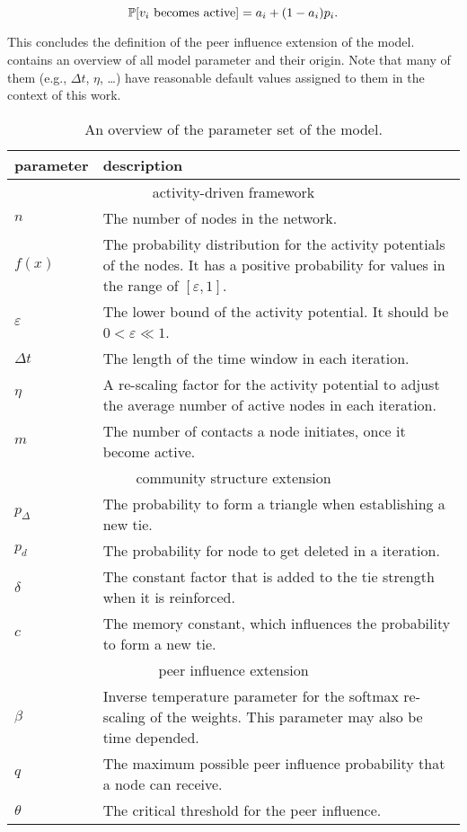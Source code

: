 \begin{equation}
    \mathbb{P}[{v_i \text{ becomes active}}] = a_{i} + (1 - a_{i}) p_{i}.
\end{equation}

This concludes the definition of the peer influence extension of the model.
 contains an overview of all model parameter and their origin.
Note that many of them (e.g., \( \Delta t \), \( \eta \), \ldots) have reasonable default values assigned to them in the context of this work.

\begin{table}[h!]
\centering
\begin{tabular}{lp{10cm}}
\hline
\textbf{parameter} & \textbf{description} \\ \hline \hline
\multicolumn{2}{c}{activity-driven framework} \\ \hline
\( n \) & The number of nodes in the network. \\
\( f(x) \) & The probability distribution for the activity potentials of the nodes. It has a positive probability for values in the range of \( [\varepsilon, 1] \). \\
\( \varepsilon \) &  The lower bound of the activity potential. It should be \( 0 < \varepsilon \ll 1 \). \\
\( \Delta t \) &  The length of the time window in each iteration. \\
\( \eta \) &  A re-scaling factor for the activity potential to adjust the average number of active nodes in each iteration. \\
\( m \) & The number of contacts a node initiates, once it become active. \\ \hline \hline

\multicolumn{2}{c}{community structure extension} \\ \hline
\( p_{\Delta} \) & The probability to form a triangle when establishing a new tie. \\
\( p_{d} \) & The probability for node to get deleted in a iteration. \\
\( \delta \) & The constant factor that is added to the tie strength when it is reinforced. \\
\( c \) &  The memory constant, which influences the probability to form a new tie.\\ \hline \hline

\multicolumn{2}{c}{peer influence extension} \\ \hline
\( \beta \) & Inverse temperature parameter for the softmax re-scaling of the weights. This parameter may also be time depended. \\
\( q \) & The maximum possible peer influence probability that a node can receive. \\
\( \theta \) & The critical threshold for the peer influence.  \\ \hline
\end{tabular}

\caption{An overview of the parameter set of the model.}
\label{tbl:all-model-parameter}
\end{table}
